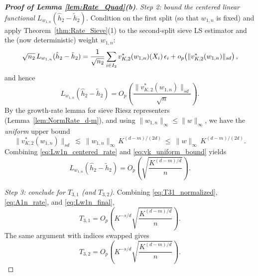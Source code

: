 \documentclass[12pt,american]{article}
\theoremstyle{definition}
\theoremstyle{plain}
\theoremstyle{definition}
\theoremstyle{plain}
\theoremstyle{plain}
\theoremstyle{plain}
\theoremstyle{plain}
\theoremstyle{plain}
\begin{document}
\begin{proof}[\textbf{Proof of Lemma \ref{lem:Rate_Quad}(b)}]
\smallskip
\noindent\emph{Step 2: bound the centered linear functional $L_{w_{1,n}}(\hat h_2-\tilde h_2)$.}
Condition on the first split (so that $w_{1,n}$ is fixed) and apply Theorem~\ref{thm:Rate_Sieve}(1) to the second-split sieve LS estimator and the (now deterministic) weight $w_{1,n}$:
\[
\sqrt{n_2}\,L_{w_{1,n}}(\hat h_2-\tilde h_2)
=
\frac{1}{\sqrt{n_2}}\sum_{i\in I_2} v^*_{K,2}(w_{1,n})(X_i)\,\epsilon_i + o_p\!\left(\|v^*_{K,2}(w_{1,n})\|_{sd}\right),
\]
and hence
\begin{equation}\label{eq:Lw1n_centered_rate}
L_{w_{1,n}}(\hat h_2-\tilde h_2)=O_p\!\left(\frac{\|v^*_{K,2}(w_{1,n})\|_{sd}}{\sqrt{n}}\right).
\end{equation}
By the growth-rate lemma for sieve Riesz representers (Lemma~\ref{lem:NormRate_d-m}), and using $\|w_{1,n}\|_\infty\le \|w\|_\infty$, we have the \emph{uniform} upper bound
\begin{equation}\label{eq:vk_uniform_bound}
\|v^*_{K,2}(w_{1,n})\|_{sd}\ \lesssim\ \|w_{1,n}\|_\infty\,K^{(d-m)/(2d)}
\ \le\ \|w\|_\infty\,K^{(d-m)/(2d)} .
\end{equation}
Combining \eqref{eq:Lw1n_centered_rate} and \eqref{eq:vk_uniform_bound} yields
\begin{equation}\label{eq:Lw1n_final}
L_{w_{1,n}}(\hat h_2-\tilde h_2)=O_p\!\left(\sqrt{\frac{K^{(d-m)/d}}{n}}\right).
\end{equation}

\smallskip
\noindent\emph{Step 3: conclude for $T_{3,1}$ (and $T_{3,2}$).}
Combining \eqref{eq:T31_normalized}, \eqref{eq:A1n_rate}, and \eqref{eq:Lw1n_final},
\[
T_{3,1}=O_p\!\left(K^{-s/d}\sqrt{\frac{K^{(d-m)/d}}{n}}\right).
\]
The same argument with indices swapped gives
\[
T_{3,2}=O_p\!\left(K^{-s/d}\sqrt{\frac{K^{(d-m)/d}}{n}}\right).
\]


\end{proof}
\end{document}

